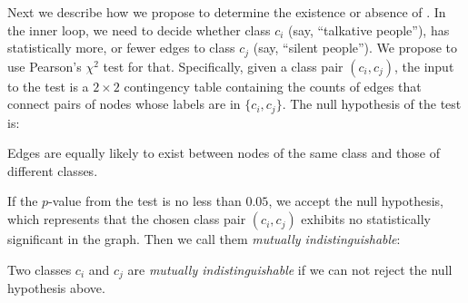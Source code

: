 Next we describe how we propose to determine
the existence or absence of \nef.
In the inner loop, we need to decide whether class $c_i$ (say, ``talkative people''), has statistically more, or fewer edges
to class
$c_j$ (say, ``silent people'').
We propose to use
Pearson's $\chi^2$ test \cite{pearson1900x} for that.
Specifically,
given a class pair $(c_i, c_j)$, the input to the test is a $2 \times 2$ contingency table containing the counts of edges that connect pairs of nodes whose labels are in $\{c_{i}, c_{j} \}$.
The null hypothesis of the test is:
\begin{h0}
Edges are equally likely to exist between nodes of the same class and those of different classes.
\end{h0}




\noindent
If the $p$-value from the test is no less than $0.05$, we accept the null hypothesis, which represents that the chosen class pair $(c_i, c_j)$ exhibits no statistically significant \nef in the graph.
Then we call them {\em mutually indistinguishable}:

\begin{definition}
\label{def:mIndistinguishable}
Two classes $c_i$ and $c_j$ are {\em mutually indistinguishable}
if we can not reject the null hypothesis above.
\end{definition}

